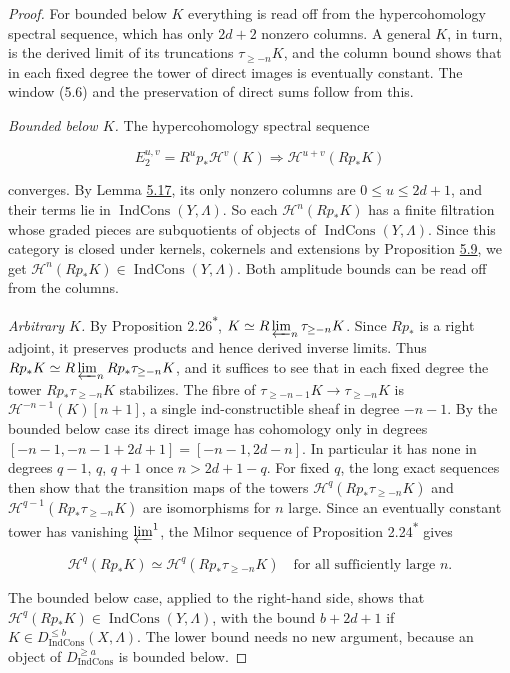 \documentclass[11pt]{article}
\newcommand{\bpout}[1]{#1\textsuperscript{\hyperlink{bp-outside}{\ensuremath{\ast}}}}
\providecommand{\Dic}{}\renewcommand{\Dic}{D_{\IndCons}}
\providecommand{\IndCons}{}\renewcommand{\IndCons}{\operatorname{IndCons}}
\begin{document}
\begin{proof}[{Proof}]\label{bp62}%
For bounded below \(K\) everything is read off from the hypercohomology spectral sequence, which has only \(2d+2\) nonzero columns. A general \(K\), in turn, is the derived limit of its truncations \(\tau_{\geq-n}K\), and the column bound shows that in each fixed degree the tower of direct images is eventually constant. The window (5.6) and the preservation of direct sums follow from this.

\emph{Bounded below \(K\).} The hypercohomology spectral sequence

\[
E_2^{u,v}=R^up_*\mathcal H^v(K)\Longrightarrow\mathcal H^{u+v}(Rp_*K)
\]

converges. By Lemma \hyperref[bp57]{5.17}, its only nonzero columns are \(0\leq u\leq2d+1\), and their terms lie in \(\IndCons(Y,\Lambda)\). So each \(\mathcal H^n(Rp_*K)\) has a finite filtration whose graded pieces are subquotients of objects of \(\IndCons(Y,\Lambda)\). Since this category is closed under kernels, cokernels and extensions by Proposition \hyperref[bp27]{5.9}, we get \(\mathcal H^n(Rp_*K)\in\IndCons(Y,\Lambda)\). Both amplitude bounds can be read off from the columns.

\emph{Arbitrary \(K\).} By Proposition \bpout{2.26}, \(K\simeq R\varprojlim_n
\tau_{\geq-n}K\). Since \(Rp_*\) is a right adjoint, it preserves products and hence derived inverse limits. Thus \(Rp_*K\simeq R\varprojlim_nRp_*\tau_{\geq-n}K\), and it suffices to see that in each fixed degree the tower \(Rp_*\tau_{\geq-n}K\) stabilizes. The fibre of \(\tau_{\geq-n-1}K\to\tau_{\geq-n}K\) is \(\mathcal H^{-n-1}(K)[n+1]\), a single ind-constructible sheaf in degree \(-n-1\). By the bounded below case its direct image has cohomology only in degrees \([-n-1,-n-1+2d+1]=[-n-1,2d-n]\). In particular it has none in degrees \(q-1\), \(q\), \(q+1\) once \(n>2d+1-q\). For fixed \(q\), the long exact sequences then show that the transition maps of the towers \(\mathcal H^q(Rp_*\tau_{\geq-n}K)\) and \(\mathcal H^{q-1}(Rp_*\tau_{\geq-n}K)\) are isomorphisms for \(n\) large. Since an eventually constant tower has vanishing \(\varprojlim^1\), the Milnor sequence of Proposition \bpout{2.24} gives

\[
\mathcal H^q(Rp_*K)\simeq
\mathcal H^q(Rp_*\tau_{\geq-n}K)\quad\text{for all sufficiently large }n.
\]

The bounded below case, applied to the right-hand side, shows that \(\mathcal H^q(Rp_*K)\in\IndCons(Y,\Lambda)\), with the bound \(b+2d+1\) if \(K\in
\Dic^{\leq b}(X,\Lambda)\). The lower bound needs no new argument, because an object of \(\Dic^{\geq a}\) is bounded below.


\end{proof}
\end{document}
